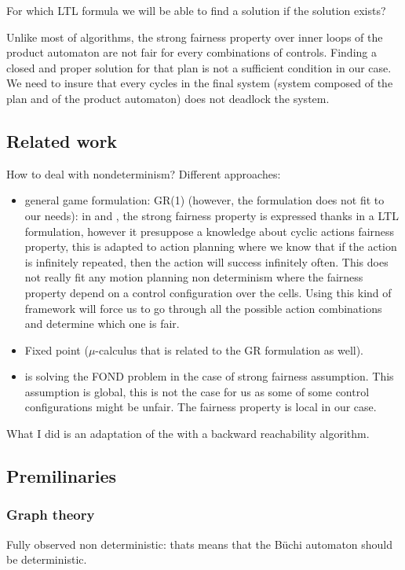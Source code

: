 For which LTL formula we will be able to find a solution if the solution exists?

Unlike most of algorithms, the strong fairness property over inner loops of the product automaton are not fair for every combinations of controls.
Finding a closed and proper solution for that plan is not a sufficient condition in our case. 
We need to insure that every cycles in the final system (system composed of the plan and of the product automaton) does not deadlock the system.

\subsection{Related work}
How to deal with nondeterminism?
Different approaches:
\begin{itemize}
\item general game formulation: GR(1) (however, the formulation does not fit to our needs): in \cite{de2010generalized} and \cite{Kissmann2009}, the strong fairness property is expressed thanks in a LTL formulation, however it presuppose a knowledge about cyclic actions fairness property, this is adapted to action planning where we know that if the action is infinitely repeated, then the action will success infinitely often. This does not really fit any motion planning non determinism where the fairness property depend on a control configuration over the cells. Using this kind of framework will force us to go through all the possible action combinations and determine which one is fair.
\item Fixed point ($\mu$-calculus that is related to the GR formulation as well).
\item \cite{fu2011simple} is solving the FOND problem in the case of strong fairness assumption. This assumption is global, this is not the case for us as some of some control configurations might be unfair. The fairness property is local in our case.
\end{itemize}

What I did is an adaptation of the \cite{fu2011simple} with a backward reachability algorithm.

\subsection{Premilinaries}

\subsubsection{Graph theory}
Fully observed non deterministic: thats means that the B\"uchi automaton should be deterministic.

